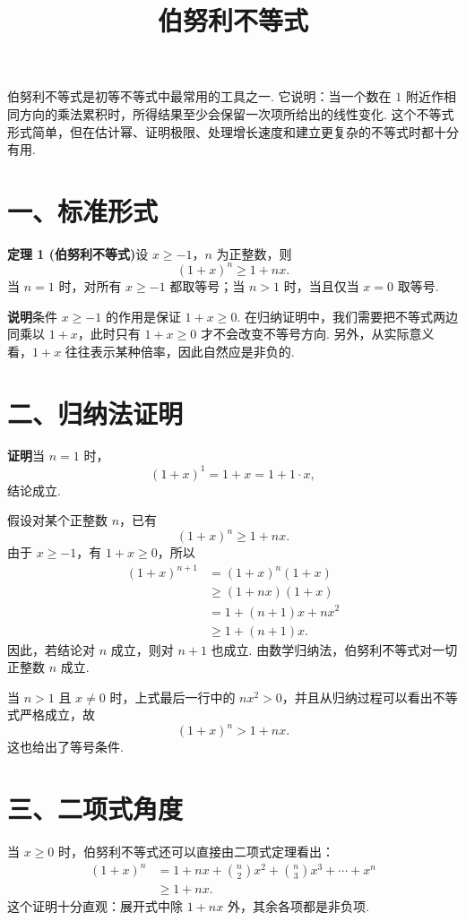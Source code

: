 \documentclass[UTF8,12pt,a4paper,fontset=fandol]{ctexart}
\title{伯努利不等式}
\author{}
\date{}
\begin{document}
\maketitle

伯努利不等式是初等不等式中最常用的工具之一. 它说明：当一个数在 $1$ 附近作相同方向的乘法累积时，所得结果至少会保留一次项所给出的线性变化. 这个不等式形式简单，但在估计幂、证明极限、处理增长速度和建立更复杂的不等式时都十分有用.

\section*{一、标准形式}

\noindent\textbf{定理 1 (伯努利不等式)}\quad 设 $x\ge -1$，$n$ 为正整数，则
\[
  (1+x)^n\ge 1+nx.
\]
当 $n=1$ 时，对所有 $x\ge -1$ 都取等号；当 $n>1$ 时，当且仅当 $x=0$ 取等号.

\noindent\textbf{说明}\quad 条件 $x\ge -1$ 的作用是保证 $1+x\ge0$. 在归纳证明中，我们需要把不等式两边同乘以 $1+x$，此时只有 $1+x\ge0$ 才不会改变不等号方向. 另外，从实际意义看，$1+x$ 往往表示某种倍率，因此自然应是非负的.

\section*{二、归纳法证明}

\noindent\textbf{证明}\quad 当 $n=1$ 时，
\[
  (1+x)^1=1+x=1+1\cdot x,
\]
结论成立.

假设对某个正整数 $n$，已有
\[
  (1+x)^n\ge 1+nx.
\]
由于 $x\ge -1$，有 $1+x\ge0$，所以
\[
\begin{aligned}
  (1+x)^{n+1}
  &= (1+x)^n(1+x)\\
  &\ge (1+nx)(1+x)\\
  &= 1+(n+1)x+nx^2\\
  &\ge 1+(n+1)x.
\end{aligned}
\]
因此，若结论对 $n$ 成立，则对 $n+1$ 也成立. 由数学归纳法，伯努利不等式对一切正整数 $n$ 成立.

当 $n>1$ 且 $x\ne0$ 时，上式最后一行中的 $nx^2>0$，并且从归纳过程可以看出不等式严格成立，故
\[
  (1+x)^n>1+nx.
\]
这也给出了等号条件.

\section*{三、二项式角度}

当 $x\ge0$ 时，伯努利不等式还可以直接由二项式定理看出：
\[
\begin{aligned}
  (1+x)^n
  &=1+nx+\binom n2x^2+\binom n3x^3+\cdots+x^n\\
  &\ge 1+nx.
\end{aligned}
\]
这个证明十分直观：展开式中除 $1+nx$ 外，其余各项都是非负项.
\end{document}
